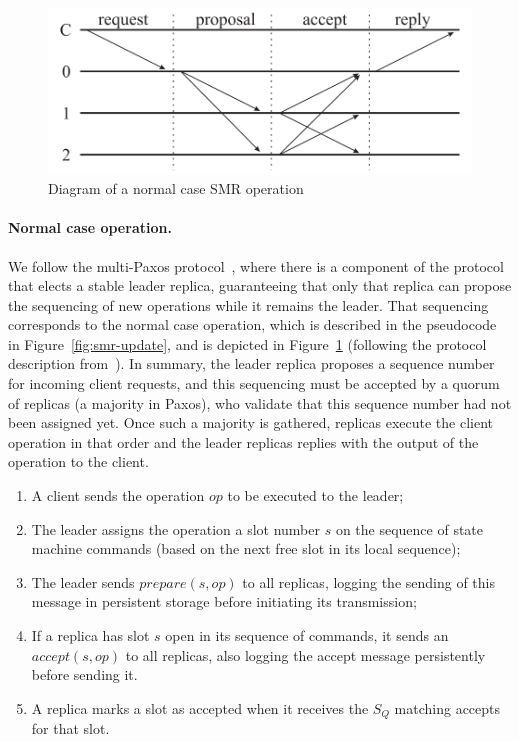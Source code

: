 
\begin{figure}[t]
    \centering
    \includegraphics[width=.65\linewidth]{img/paxos}
    \caption{Diagram of a normal case SMR operation}\label{fig:paxos}
\end{figure}
\paragraph{Normal case operation.}
We follow the multi-Paxos protocol~\cite{paxos_simple,paxos_engineering},
where there is a component of the protocol that elects a stable
leader replica, guaranteeing that only that replica can propose
the sequencing of new operations while it remains the leader.
That sequencing corresponds to the normal case operation, which
is described in the pseudocode in Figure~\ref{fig:smr-update},
and is depicted in Figure~\ref{fig:paxos} (following the protocol
description from~\cite{paxos_builders}). In summary, the leader
replica proposes a sequence number for incoming client requests,
and this sequencing must be accepted by a quorum of replicas (a
majority in Paxos), who validate that this sequence number had
not been assigned yet. Once such a majority is gathered, replicas
execute the client operation in that order and the leader
replicas replies with the output of the operation to the client.

\begin{enumerate}
    \item A client sends the operation $op$ to be executed to the leader;
    \item The leader assigns the operation a slot number $s$ on the
      sequence of state machine commands (based on the next free slot in
      its local sequence);
    \item The leader sends $prepare(s, op)$ to all replicas,
        logging the sending of this message in persistent storage
        before initiating its transmission;
    \item If a replica has slot $s$ open in its sequence of commands, it sends an
        $accept(s, op)$ to all replicas, also logging the accept
        message persistently before sending it.
    \item A replica marks a slot as accepted when it receives
      the $S_Q$ matching accepts for that slot.
\end{enumerate}
\fi

